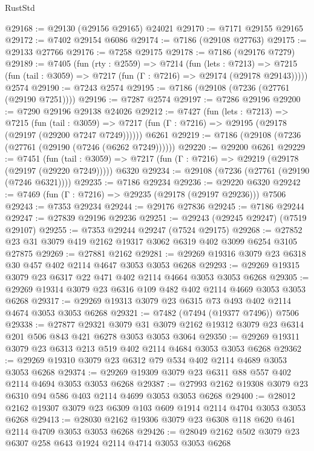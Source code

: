 \begin{lexlean}{RustStd}
\begin{coremodule}
{\begin{coremodule}
{{{{{{{{{{{{{{{{{{{{{{{{{{{{{{{{@29168 := @29130 (@29156 @29165) @24021
@29170 := @7171 @29155 @29165
@29172 := @7402 @29154 @6086
@29174 := @7186 (@29108 @27763)
@29175 := @29133 @27766
@29176 := @7258 @29175
@29178 := @7186 (@29176 @7279)
@29189 := @7405
    (fun (rty : @2559) =>
    @7214
      (fun (lets : @7213) =>
      @7215 (fun (tail : @3059) => @7217 (fun (Γ : @7216) => @29174 (@29178 @29143)))))
    @2574
@29190 := @7243 @2574
@29195 := @7186 (@29108 (@7236 (@27761 (@29190 @7251))))
@29196 := @7287 @2574
@29197 := @7286 @29196
@29200 := @7290 @29196 @29138 @24026
@29212 := @7427
    (fun (lets : @7213) =>
    @7215
      (fun (tail : @3059) =>
      @7217 (fun (Γ : @7216) => @29195 (@29178 (@29197 (@29200 @7247 @7249))))))
    @6261
@29219 := @7186 (@29108 (@7236 (@27761 (@29190 (@7246 (@6262 @7249))))))
@29220 := @29200 @6261
@29229 := @7451
    (fun (tail : @3059) => @7217 (fun (Γ : @7216) => @29219 (@29178 (@29197 (@29220 @7249)))))
    @6320
@29234 := @29108 (@7236 (@27761 (@29190 (@7246 @6321))))
@29235 := @7186 @29234
@29236 := @29220 @6320
@29242 := @7469 (fun (Γ : @7216) => @29235 (@29178 (@29197 @29236))) @7506
@29243 := @7353 @29234
@29244 := @29176 @27836
@29245 := @7186 @29244
@29247 := @27839 @29196 @29236
@29251 := @29243 (@29245 @29247) (@7519 @29107)
@29255 := @7353 @29244 @29247 (@7524 @29175)
@29268 := @27852 @23 @31 @3079 @419 @2162 @19317 @3062 @6319 @402 @3099 @6254 @3105 @27875
@29269 := @27881 @2162
@29281 := @29269 @19316 @3079 @23 @6318 @30 @457 @402 @2114 @4647 @3053 @3053 @6268
@29293 := @29269 @19315 @3079 @23 @6317 @22 @471 @402 @2114 @4664 @3053 @3053 @6268
@29305 := @29269 @19314 @3079 @23 @6316 @109 @482 @402 @2114 @4669 @3053 @3053 @6268
@29317 := @29269 @19313 @3079 @23 @6315 @73 @493 @402 @2114 @4674 @3053 @3053 @6268
@29321 := @7482 (@7494 (@19377 @7496)) @7506
@29338 := @27877
    @29321
    @3079
    @31
    @3079
    @2162
    @19312
    @3079
    @23
    @6314
    @201
    @506
    @843
    @421
    @6278
    @3053
    @3053
    @3064
@29350 := @29269 @19311 @3079 @23 @6313 @213 @519 @402 @2114 @4684 @3053 @3053 @6268
@29362 := @29269 @19310 @3079 @23 @6312 @79 @534 @402 @2114 @4689 @3053 @3053 @6268
@29374 := @29269 @19309 @3079 @23 @6311 @88 @557 @402 @2114 @4694 @3053 @3053 @6268
@29387 := @27993 @2162 @19308 @3079 @23 @6310 @94 @586 @403 @2114 @4699 @3053 @3053 @6268
@29400 := @28012 @2162 @19307 @3079 @23 @6309 @103 @609 @1914 @2114 @4704 @3053 @3053 @6268
@29413 := @28030 @2162 @19306 @3079 @23 @6308 @118 @620 @461 @2114 @4709 @3053 @3053 @6268
@29426 := @28049 @2162 @502 @3079 @23 @6307 @258 @643 @1924 @2114 @4714 @3053 @3053 @6268
}}}}}}}}}}}}}}}}}}}}}}}}}}}}}}}}
\end{coremodule}}
\end{coremodule}
\end{lexlean}
